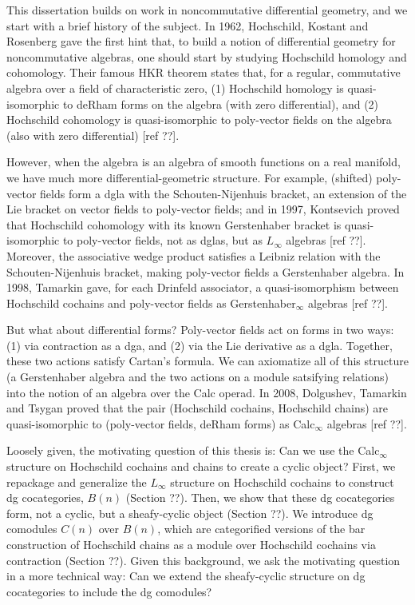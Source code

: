 \documentclass[12pt]{article} %
\begin{document}
This dissertation builds on work in noncommutative differential geometry, and we start with a brief history of the subject. In 1962, Hochschild, Kostant and Rosenberg gave the first hint that, to build a notion of differential geometry for noncommutative algebras, one should start by studying Hochschild homology and cohomology. Their famous HKR theorem states that, for a regular, commutative algebra over a field of characteristic zero, (1) Hochschild homology is quasi-isomorphic to deRham forms on the algebra (with zero differential), and (2) Hochschild cohomology is quasi-isomorphic to poly-vector fields on the algebra (also with zero differential) [ref ??].

However, when the algebra is an algebra of smooth functions on a real manifold, we have much more differential-geometric structure. For example, (shifted) poly-vector fields form a dgla with the Schouten-Nijenhuis bracket, an extension of the Lie bracket on vector fields to poly-vector fields; and in 1997, Kontsevich proved that Hochschild cohomology with its known Gerstenhaber bracket is quasi-isomorphic to poly-vector fields, not as dglas, but as $L_\infty$ algebras [ref ??]. Moreover, the associative wedge product satisfies a Leibniz relation with the Schouten-Nijenhuis bracket, making poly-vector fields a Gerstenhaber algebra. In 1998, Tamarkin gave, for each Drinfeld associator, a quasi-isomorphism between Hochschild cochains and poly-vector fields as Gerstenhaber$_\infty$ algebras [ref ??].

But what about differential forms? Poly-vector fields act on forms in two ways: (1) via contraction as a dga, and (2) via the Lie derivative as a dgla. Together, these two actions satisfy Cartan's formula. We can axiomatize all of this structure (a Gerstenhaber algebra and the two actions on a module satsifying relations) into the notion of an algebra over the Calc operad. In 2008, Dolgushev, Tamarkin and Tsygan proved that the pair (Hochschild cochains, Hochschild chains) are quasi-isomorphic to (poly-vector fields, deRham forms) as Calc$_\infty$ algebras [ref ??].

Loosely given, the motivating question of this thesis is: Can we use the Calc$_\infty$ structure on Hochschild cochains and chains to create a cyclic object? First, we repackage and generalize the $L_\infty$ structure on Hochschild cochains to construct dg cocategories, $B(n)$ (Section ??). Then, we show that these dg cocategories form, not a cyclic, but a sheafy-cyclic object (Section ??). We introduce dg comodules $C(n)$ over $B(n)$, which are categorified versions of the bar construction of Hochschild chains as a module over Hochschild cochains via contraction (Section ??). Given this background, we ask the motivating question in a more technical way: Can we extend the sheafy-cyclic structure on dg cocategories to include the dg comodules?
\end{document}
